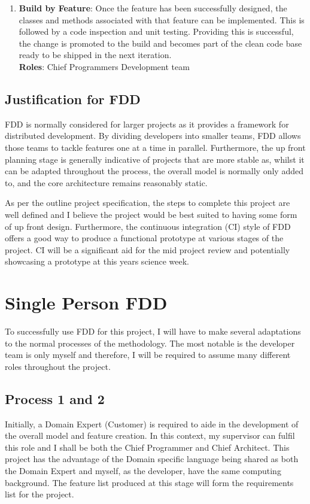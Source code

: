 \documentclass{article}
\begin{document}
\begin{enumerate}
	
	\item \textbf{Build by Feature}: Once the feature has been successfully designed, the classes and methods associated with that feature can be implemented. This is followed by a code inspection and unit testing. Providing this is successful, the change is promoted to the build and becomes part of the clean code base ready to be shipped in the next iteration.
	\\
	\textbf{Roles}: Chief Programmers \textbullet{} Development team

\end{enumerate}

\subsection{Justification for FDD}
FDD is normally considered for larger projects as it provides a framework for distributed development. By dividing developers into smaller teams, FDD allows those teams to tackle features one at a time in parallel. Furthermore, the up front planning stage is generally indicative of projects that are more stable as, whilst it can be adapted throughout the process, the overall model is normally only added to, and the core architecture remains reasonably static.

As per the outline project specification, the steps to complete this project are well defined and I believe the project would be best suited to having some form of up front design. Furthermore, the continuous integration (CI) style of FDD offers a good way to produce a functional prototype at various stages of the project. CI will be a significant aid for the mid project review and potentially showcasing a prototype at this years science week.

\newpage

\section{Single Person FDD}
To successfully use FDD for this project, I will have to make several adaptations to the normal processes of the methodology. The most notable is the developer team is only myself and therefore, I will be required to assume many different roles throughout the project.


\subsection{Process 1 and 2}
Initially, a Domain Expert (Customer) is required to aide in the development of the overall model and feature creation. In this context, my supervisor can fulfil this role and I shall be both the Chief Programmer and Chief Architect. This project has the advantage of the Domain specific language being shared as both the Domain Expert and myself, as the developer, have the same computing background. The feature list produced at this stage will form the requirements list for the project.
\end{document}
